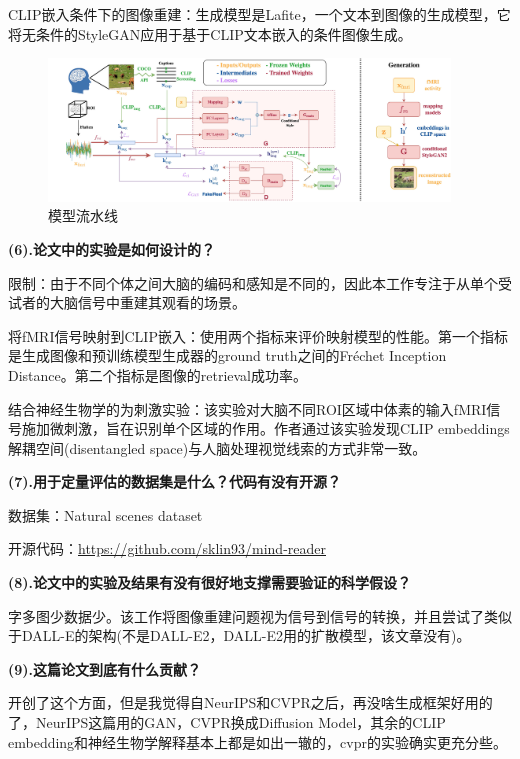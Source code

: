 \documentclass[12pt, a4paper, oneside]{ctexart}
\begin{document}
    CLIP嵌入条件下的图像重建：生成模型是Lafite，一个文本到图像的生成模型，它将无条件的StyleGAN应用于基于CLIP文本嵌入的条件图像生成。

     \begin{figure}[htbp]
        \centering
        \includegraphics[width=0.95\textwidth]{pic/4.9_pipeline.jpg}
        \caption{模型流水线}
        \label{pipeline}
    \end{figure}

    \noindent\textbf{(6).论文中的实验是如何设计的？}

    限制：由于不同个体之间大脑的编码和感知是不同的，因此本工作专注于从单个受试者的大脑信号中重建其观看的场景。

    将fMRI信号映射到CLIP嵌入：使用两个指标来评价映射模型的性能。第一个指标是生成图像和预训练模型生成器的ground truth之间的Fréchet Inception Distance。第二个指标是图像的retrieval成功率。

    结合神经生物学的为刺激实验：该实验对大脑不同ROI区域中体素的输入fMRI信号施加微刺激，旨在识别单个区域的作用。作者通过该实验发现CLIP embeddings解耦空间(disentangled space)与人脑处理视觉线索的方式非常一致。

    \noindent\textbf{(7).用于定量评估的数据集是什么？代码有没有开源？}

    数据集：Natural scenes dataset\cite{Allen2022}

    开源代码：\url{https://github.com/sklin93/mind-reader}

    \noindent\textbf{(8).论文中的实验及结果有没有很好地支撑需要验证的科学假设？}

    字多图少数据少。该工作将图像重建问题视为信号到信号的转换，并且尝试了类似于DALL-E的架构(不是DALL-E2，DALL-E2用的扩散模型，该文章没有)。

    \noindent\textbf{(9).这篇论文到底有什么贡献？}

    开创了这个方面，但是我觉得自NeurIPS和CVPR之后，再没啥生成框架好用的了，NeurIPS这篇用的GAN，CVPR换成Diffusion Model，其余的CLIP embedding和神经生物学解释基本上都是如出一辙的，cvpr的实验确实更充分些。
\end{document}
